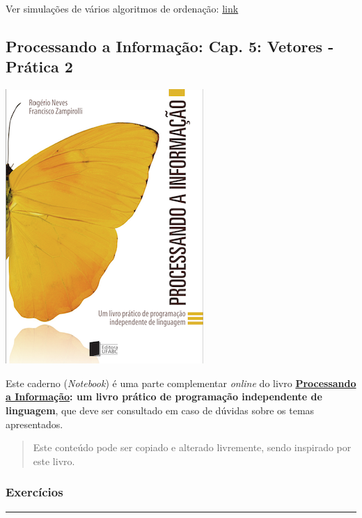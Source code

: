 \documentclass[12pt,a4paper]{article}
\renewcommand{\linethickness}{0.05em}
\begin{document}
Ver simulações de vários algoritmos de ordenação:
\href{https://www.toptal.com/developers/sorting-algorithms}{link}

    \hypertarget{processando-a-informauxe7uxe3o-cap.-5-vetores---pruxe1tica-2}{%
\subsection{Processando a Informação: Cap. 5: Vetores - Prática
2}\label{processando-a-informauxe7uxe3o-cap.-5-vetores---pruxe1tica-2}}

    \includegraphics{"figs/Capa_Processando_Informacao.jpg"}

Este caderno (\emph{Notebook}) é uma parte complementar \emph{online} do
livro
\textbf{\href{https://editora.ufabc.edu.br/matematica-e-ciencias-da-computacao/58-processando-a-informacao}{Processando
a Informação}: um livro prático de programação independente de
linguagem}, que deve ser consultado em caso de dúvidas sobre os temas
apresentados.

\begin{quote}
Este conteúdo pode ser copiado e alterado livremente, sendo inspirado
por este livro.
\end{quote}

    \hypertarget{exercuxedcios}{%
\subsubsection{Exercícios}\label{exercuxedcios}}

    \begin{center}\rule{0.5\linewidth}{\linethickness}\end{center}
\end{document}
